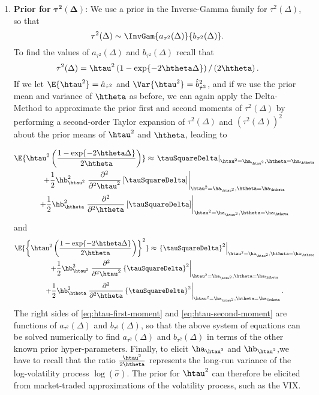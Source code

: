 \begin{enumerate}
\item{\textbf{Prior for} $\boldsymbol{\tau^2}(\boldsymbol{\Delta})$:} We use a prior in the Inverse-Gamma family for $\tau^2(\Delta)$, so that
$$
\tau^2(\Delta) \sim \InvGam{ a_{\tau^2}(\Delta)}{b_{\tau^2}(\Delta) }.
$$
To find the values of $a_{\tau^2}(\Delta)$ and $b_{\tau^2}(\Delta)$ recall that
\[\tau^2(\Delta) = \htau^2 \left( 1 - \exp\{ -2\htheta \Delta \}
  \right)/ \left( 2\htheta \right).\]
If we let $\E{\htau^2} = \hat{a}_{\hat{\tau}^2}$ and
$\Var{\htau^2} = \hat{b}^2_{\hat{\tau}^2}$, and if we use the prior
mean and variance of $\htheta$ as before, we can again apply the
Delta-Method to approximate the prior first and second moments of
$\tau^2(\Delta)$ by performing a second-order Taylor expansion of
$\tau^2(\Delta)$ and $(\tau^2(\Delta))^2$ about the prior means of
$\htau^2$ and $\htheta$, leading to

\begin{multline} \label{eq:htau-first-moment}
\E{\htau^2 \left( \frac{1 - \exp\{ -2\htheta \Delta  \}}{2\htheta} \right)} \approx  \left. \tauSquareDelta \right|_{\htau^2 =  \ha_{\htau^2}, \htheta = \ha_{\htheta}}   \\
%
+  \frac{1}{2} \hb^2_{\htau^2}  \left. \frac{\partial^2}{\partial^2 \htau^2} \left[ \tauSquareDelta \right] \right|_{\htau^2 = \ha_{\htau^2}, \htheta = \ha_{\htheta}}   \\
+  \frac{1}{2} \hb^2_{\htheta}  \left. \frac{\partial^2}{\partial^2 \htheta} \left[ \tauSquareDelta \right] \right|_{\htau^2 = \ha_{\htau^2}, \htheta = \ha_{\htheta}}
\end{multline}
and
\begin{multline}  \label{eq:htau-second-moment}
\E{\left\{\htau^2 \left( \frac{1 - \exp\{ -2\htheta \Delta \}}{2\htheta} \right) \right\}^2} \approx  \left. \left\{ \tauSquareDelta\right\}^2 \right|_{\htau^2 = \ha_{\htau^2}, \htheta = \ha_{\htheta}}   \\
%
+  \frac{1}{2} \hb^2_{\htau^2}   \left. \frac{\partial^2}{\partial^2 \htau^2} \left\{ \tauSquareDelta \right\}^2 \right|_{\htau^2 = \ha_{\htau^2}, \htheta = \ha_{\htheta}}  \\
%
+  \frac{1}{2} \hb^2_{\htheta}   \left. \frac{\partial^2}{\partial^2 \htheta} \left\{ \tauSquareDelta \right\}^2 \right|_{\htau^2 = \ha_{\htau^2}, \htheta = \ha_{\htheta}}    .
\end{multline}
The right sides of \eqref{eq:htau-first-moment} and \eqref{eq:htau-second-moment} are functions of $a_{\tau^2}(\Delta)$ and $b_{\tau^2}(\Delta)$, so that the above system of equations can be solved numerically to find $a_{\tau^2}(\Delta)$ and $b_{\tau^2}(\Delta)$ in terms of the other known prior hyper-parameters. Finally, to elicit $\ha_{\htau^2}$ and $\hb_{\htau^2}$,we have to recall that the ratio $\frac{\htau^2}{2\htheta}$ represents the long-run variance of the log-volatility process $\log(\hat{\sigma})$. The prior for $\htau^2$ can therefore be elicited from market-traded approximations of the volatility process, such as the VIX.



\end{enumerate}
